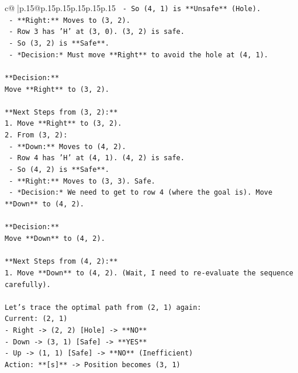 \documentclass{article}
\begin{document}
{\begin{supertabular}{c@{$\;$}|p{.15\linewidth}@{}p{.15\linewidth}p{.15\linewidth}p{.15\linewidth}p{.15\linewidth}p{.15\linewidth}}
{{{\texttt{        {-}   So (4, 1) is **Unsafe** (Hole).} \\
\texttt{    {-}   **Right:** Moves to (3, 2).} \\
\texttt{        {-}   Row 3 has 'H' at (3, 0). (3, 2) is safe.} \\
\texttt{        {-}   So (3, 2) is **Safe**.} \\
\texttt{    {-}   *Decision:* Must move **Right** to avoid the hole at (4, 1).} \\
\\ 
\texttt{**Decision:**} \\
\texttt{Move **Right** to (3, 2).} \\
\\ 
\texttt{**Next Steps from (3, 2):**} \\
\texttt{1.  Move **Right** to (3, 2).} \\
\texttt{2.  From (3, 2):} \\
\texttt{    {-}   **Down:** Moves to (4, 2).} \\
\texttt{        {-}   Row 4 has 'H' at (4, 1). (4, 2) is safe.} \\
\texttt{        {-}   So (4, 2) is **Safe**.} \\
\texttt{    {-}   **Right:** Moves to (3, 3). Safe.} \\
\texttt{    {-}   *Decision:* We need to get to row 4 (where the goal is). Move **Down** to (4, 2).} \\
\\ 
\texttt{**Decision:**} \\
\texttt{Move **Down** to (4, 2).} \\
\\ 
\texttt{**Next Steps from (4, 2):**} \\
\texttt{1.  Move **Down** to (4, 2). (Wait, I need to re{-}evaluate the sequence carefully).} \\
\\ 
\texttt{Let's trace the optimal path from (2, 1) again:} \\
\texttt{Current: (2, 1)} \\
\texttt{{-} Right {-}> (2, 2) {[}Hole{]} {-}> **NO**} \\
\texttt{{-} Down {-}> (3, 1) {[}Safe{]} {-}> **YES**} \\
\texttt{{-} Up {-}> (1, 1) {[}Safe{]} {-}> **NO** (Inefficient)} \\
\texttt{Action: **{[}s{]}** {-}> Position becomes (3, 1)} \\
\\ 
}}}
\end{supertabular}}
\end{document}
